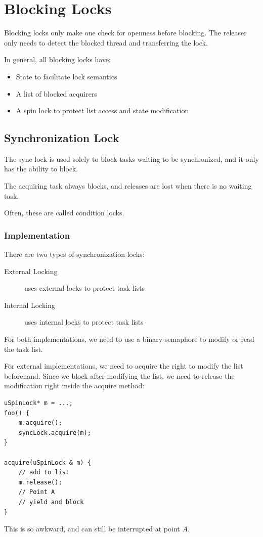        \section{Blocking Locks} %
        \label{sec:blocking_locks}
            Blocking locks only make one check for openness before blocking.
            The releaser only needs to detect the blocked thread and transferring the lock.

            In general, all blocking locks have:
            \begin{itemize}
                \item State to facilitate lock semantics
                \item A list of blocked acquirers
                \item A spin lock to protect list access and state modification
            \end{itemize}

            \subsection{Synchronization Lock} %
            \label{sub:synchronization_lock}
                The sync lock is used solely to block tasks waiting to be synchronized, and it only has the ability to block.

                The acquiring task always blocks, and releases are lost when there is no waiting task.

                Often, these are called condition locks.

                \subsubsection{Implementation} %
                \label{ssub:implementation}
                    There are two types of synchronization locks:
                    \begin{description}
                        \item[External Locking] uses external locks to protect task lists
                        \item[Internal Locking] uses internal locks to protect task lists
                    \end{description}
                    For both implementations, we need to use a binary semaphore to modify or read the task list.

                    For external implementations, we need to acquire the right to modify the list beforehand.
                    Since we block after modifying the list, we need to release the modification right inside the acquire method:
                    \begin{lstlisting}
uSpinLock* m = ...;
foo() {
    m.acquire();
    syncLock.acquire(m);
}

acquire(uSpinLock & m) {
    // add to list
    m.release();
    // Point A
    // yield and block
}
                    \end{lstlisting}
                    This is so awkward, and can still be interrupted at point $A$.
